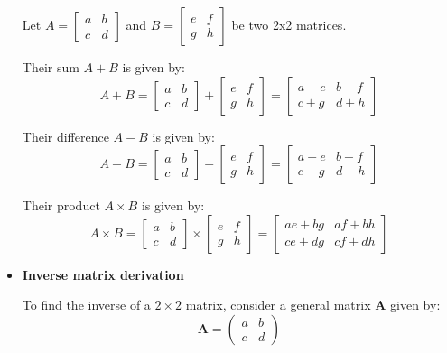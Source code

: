 \documentclass[a4paper,12pt]{article}
\begin{document}
\begin{itemize}[leftmargin=*]
    Let $A = \begin{bmatrix} a & b \\ c & d \end{bmatrix}$ and $B = \begin{bmatrix} e & f \\ g & h \end{bmatrix}$ be two 2x2 matrices.

    Their sum $A + B$ is given by:  
    \[
    A + B = \begin{bmatrix} a & b \\ c & d \end{bmatrix} + \begin{bmatrix} e & f \\ g & h \end{bmatrix} = \begin{bmatrix} a+e & b+f \\ c+g & d+h \end{bmatrix}
    \]
    
    Their difference $A - B$ is given by:
    \[
    A - B = \begin{bmatrix} a & b \\ c & d \end{bmatrix} - \begin{bmatrix} e & f \\ g & h \end{bmatrix} = \begin{bmatrix} a-e & b-f \\ c-g & d-h \end{bmatrix}
    \]

    Their product $A \times B$ is given by:
    \[
    A \times B = \begin{bmatrix} a & b \\ c & d \end{bmatrix} \times \begin{bmatrix} e & f \\ g & h \end{bmatrix} = \begin{bmatrix} ae+bg & af+bh \\ ce+dg & cf+dh \end{bmatrix}
    \] 



\item \textbf{Inverse matrix derivation} 

To find the inverse of a \(2 \times 2\) matrix, consider a general matrix \( \mathbf{A} \) given by:
\[
\mathbf{A} = \begin{pmatrix}
a & b \\
c & d
\end{pmatrix}
\]


\end{itemize}
\end{document}
